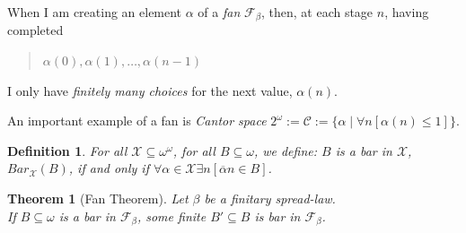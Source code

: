 \documentclass[a4paper]{amsart}
\theoremstyle{plain}
\newtheorem{theorem}{Theorem}
\newtheorem{definition}{Definition}
\begin{document}
When I am creating an element $\alpha$ of a {\it fan} $\mathcal{F}_\beta$, then, at each stage $n$,  having completed \begin{quote} $\alpha(0), \alpha(1), \ldots, \alpha(n-1)$ \end{quote} I only have {\it finitely many choices} for the next value, $\alpha(n)$. 

\smallskip An important example of a fan is {\it Cantor space} $2^\omega:=\mathcal{C}:=\{\alpha\mid\forall n[\alpha(n)\le 1]\}$. 

\begin{definition} For all $\mathcal{X}\subseteq \omega^\omega$, for all $B\subseteq \omega$,  we define: \emph{$B$ is a bar in $\mathcal{X}$, $Bar_\mathcal{X}(B)$,}  if and only if $\forall \alpha \in \mathcal{X}\exists n[\overline \alpha n \in B]$. \end{definition}

\begin{theorem}[Fan Theorem]\label{T:fantheorem} Let $\beta$ be a finitary spread-law. \\If $B\subseteq \omega$ is a bar in $\mathcal{F}_\beta$, some finite $B'\subseteq B$ is  bar in $\mathcal{F}_\beta$. \end{theorem}
\end{document}
